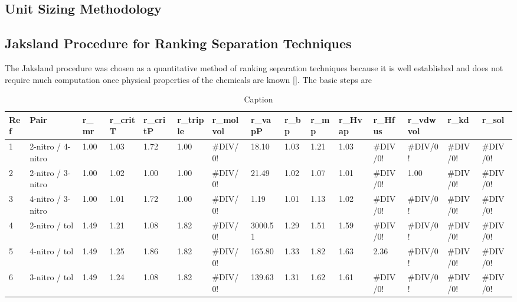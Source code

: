 \begin{landscape}
\section{Unit Sizing Methodology}
\subsection{Jaksland Procedure for Ranking Separation Techniques}
The Jaksland procedure was chosen as a quantitative method of ranking separation techniques because it is well established and does not require much computation once physical properties of the chemicals are known []. The basic steps are 
\begin{table}[h]
\centering
\caption{Caption}
\begin{tabular}{@{}lllllllllllllll@{}}
\toprule
Ref & Pair              & r\_mr & r\_critT & r\_critP & r\_triple & r\_molvol & r\_vapP & r\_bp & r\_mp & r\_Hvap & r\_Hfus  & r\_vdwvol & r\_kd    & r\_sol   \\ \midrule
1   & 2-nitro / 4-nitro & 1.00  & 1.03     & 1.72     & 1.00      & \#DIV/0!  & 18.10   & 1.03  & 1.21  & 1.03    & \#DIV/0! & \#DIV/0!  & \#DIV/0! & \#DIV/0! \\
2   & 2-nitro / 3-nitro & 1.00  & 1.02     & 1.00     & 1.00      & \#DIV/0!  & 21.49   & 1.02  & 1.07  & 1.01    & \#DIV/0! & 1.00      & \#DIV/0! & \#DIV/0! \\
3   & 4-nitro / 3-nitro & 1.00  & 1.01     & 1.72     & 1.00      & \#DIV/0!  & 1.19    & 1.01  & 1.13  & 1.02    & \#DIV/0! & \#DIV/0!  & \#DIV/0! & \#DIV/0! \\
4   & 2-nitro / tol     & 1.49  & 1.21     & 1.08     & 1.82      & \#DIV/0!  & 3000.51 & 1.29  & 1.51  & 1.59    & \#DIV/0! & \#DIV/0!  & \#DIV/0! & \#DIV/0! \\
5   & 4-nitro / tol     & 1.49  & 1.25     & 1.86     & 1.82      & \#DIV/0!  & 165.80  & 1.33  & 1.82  & 1.63    & 2.36     & \#DIV/0!  & \#DIV/0! & \#DIV/0! \\
6   & 3-nitro / tol     & 1.49  & 1.24     & 1.08     & 1.82      & \#DIV/0!  & 139.63  & 1.31  & 1.62  & 1.61    & \#DIV/0! & \#DIV/0!  & \#DIV/0! & \#DIV/0! \\ \bottomrule
\end{tabular}
\end{table}
\label{app:sizing}



\end{landscape}
